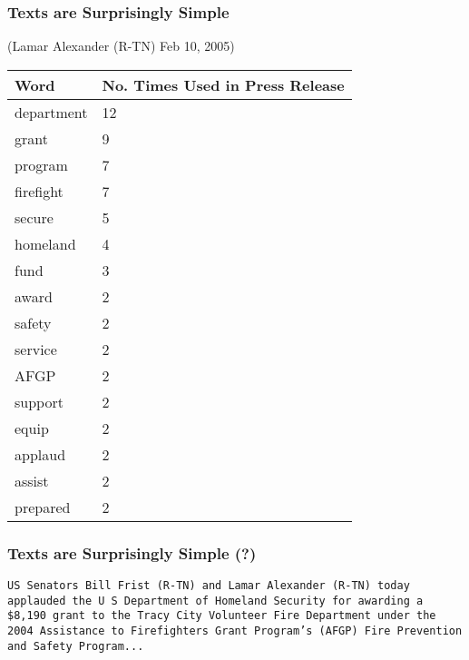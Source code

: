 \documentclass{beamer}
\numberwithin{equation}{section}
\begin{document}
\begin{frame}
\frametitle{Texts are Surprisingly Simple}

(Lamar Alexander (R-TN) Feb 10, 2005)
\begin{table}
\begin{tabular}{ll}
\hline
 Word & No. Times Used in Press Release \\
 \hline
 department &     12\\
  grant  &      9 \\
  program &   7 \\
  firefight &  7 \\
  secure  &    5 \\
  homeland  &  4 \\
  fund   &    3 \\
 award  &    2 \\
 safety  &     2 \\
 service &    2 \\
 AFGP   &    2 \\
 support &   2 \\
equip  &    2 \\
applaud  &  2\\
 assist  &   2\\
prepared &  2 \\
\hline
\end{tabular}
\end{table}



\end{frame}




\begin{frame}
\frametitle{Texts are Surprisingly Simple (?)}

{\tt US  Senators Bill Frist  (R-TN)  and Lamar Alexander (R-TN) today applauded the U S  Department of Homeland Security for awarding a \$8,190 grant to the Tracy City Volunteer Fire Department under the 2004 Assistance to Firefighters Grant Program's  (\alert{AFGP})  Fire Prevention and Safety Program...}


\end{frame}
\end{document}
